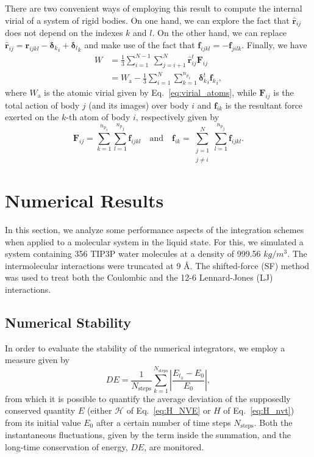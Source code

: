 \documentclass[aip,jcp,reprint,amsmath,amssymb,raggedbottom]{revtex4-1}
\newcommand{\vt}[1]{\boldsymbol{\mathbf{#1}}}           %
\newcommand{\tr}[1]{#1^t}                               %
\begin{document}
There are two convenient ways of employing this result to compute the internal virial of a system of rigid bodies. On one hand, we can explore the fact that ${\hat{\vt r}}_{ij}$ does not depend on the indexes $k$ and $l$. On the other hand, we can replace $\hat{\vt r}_{ij} = {\vt r}_{ijkl} - {{\vt \delta}_k}_i + {{\vt \delta}_l}_k$ and make use of the fact that $\vt f_{ijkl} = -\vt f_{jilk}$. Finally, we have
\begin{subequations}
	\label{eq:virial_rigid_bodies}
	\begin{align}
	W &= \frac{1}{3} \sum_{i=1}^{N-1} \sum_{j=i+1}^N \tr{\hat{\vt r}}_{ij} \vt F_{ij} \\
	  &= W_\text{a} - \frac{1}{3} \sum_{i=1}^N \sum_{k=1}^{{n_p}_i} {\tr{\vt \delta}_k}_i {{\vt f}_k}_i,
	\end{align}
\end{subequations}
where $W_\text{a}$ is the atomic virial given by Eq.~\ref{eq:virial_atoms}, while $\vt F_{ij}$ is the total action of body $j$ (and its images) over body $i$ and $\vt f_{ik}$ is the resultant force exerted on the $k$-th atom of body $i$, respectively given by
\
\[
\vt F_{ij} = \sum_{k=1}^{{n_p}_i} \sum_{l=1}^{{n_p}_j} \vt f_{ijkl} \quad \text{and} \quad \vt f_{ik} = \sum_{\substack{j=1\\j \neq i}}^N \sum_{l=1}^{{n_p}_j} \vt f_{ijkl}.
\]

\section{Numerical Results}

In this section, we analyze some performance aspects of the integration schemes when applied to a molecular system in the liquid state. For this, we simulated a system containing 356 TIP3P water molecules\cite{Price2004} at a density of 999.56 $kg/m^3$. The intermolecular interactions were truncated at 9 \AA. The shifted-force (SF) method\cite{Allen1989, Fennell2006, Toxvaerd_2011} was used to treat both the Coulombic and the 12-6 Lennard-Jones (LJ) interactions.

\subsection{Numerical Stability}
\label{sec:performance}

In order to evaluate the stability of the numerical integrators, we employ a measure given by\cite{Tuckerman2010}
\begin{equation}
\label{eq:performance}
D\!E =  \frac{1}{N_\text{steps}} \sum_{k=1}^{N_\text{steps}} \left| \frac{E_{t_k} - E_0}{E_0} \right|,
\end{equation}
from which it is possible to quantify the average deviation of the supposedly conserved quantity $E$ (either $\mathcal{H}$ of Eq.~\ref{eq:H_NVE} or $H$ of Eq.~\ref{eq:H_nvt}) from its initial value $E_0$ after a certain number of time steps $N_\text{steps}$. Both the instantaneous fluctuations, given by the term inside the summation, and the long-time conservation of energy, $D\!E$, are monitored.
\end{document}
